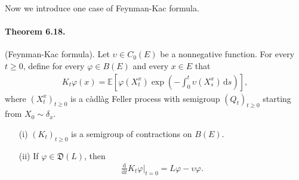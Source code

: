 \documentclass{article}
\numberwithin{equation}{section}
\newcommand{\E}{\mathbb{E}}
\renewcommand{\d}{\mathrm{d}}
\theoremstyle{plain}
\theoremstyle{definition}
\begin{document}
Now we introduce one case of Feynman-Kac formula.
\paragraph{Theorem 6.18.\label{thm:6.18}} (Feynman-Kac formula). Let $\upsilon\in C_0(E)$ be a nonnegative function. For every $t\geq 0$, define for every $\varphi\in B(E)$ and every $x\in E$ that
\begin{align*}
K_t\varphi(x)=\E\left[\varphi(X_t^x)\exp\left(-\int_0^t\upsilon(X_s^x)\,\d s\right)\right],
\end{align*}
where $(X_t^x)_{t\geq 0}$ is a càdlàg Feller process with semigroup $(Q_t)_{t\geq 0}$ starting from $X_0\sim\delta_x$.
\begin{itemize}
	\item[(i)] $(K_t)_{t\geq 0}$ is a semigroup of contractions on $B(E)$.
	\item[(ii)] If $\varphi\in\mathfrak{D}(L)$, then
	\begin{align*}
		\frac{\d}{\d t}K_t\varphi|_{t=0} = L\varphi - \upsilon\varphi.
	\end{align*}
\end{itemize}
\end{document}
